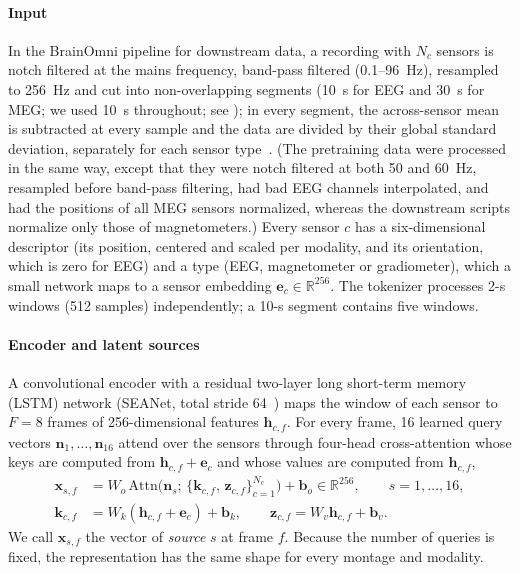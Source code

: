 \documentclass[10pt,letterpaper]{article}
\newcommand{\R}{\mathbb{R}}
\begin{document}
\paragraph*{Input} In the BrainOmni pipeline for downstream data, a recording with $N_c$
sensors is notch filtered at the mains frequency, band-pass filtered (0.1--96~Hz), resampled
to 256~Hz and cut into non-overlapping segments (10~s for EEG and 30~s for MEG; we used 10~s
throughout; see ); in every segment, the across-sensor mean
is subtracted at every sample and the data are divided by their global standard deviation,
separately for each sensor type~\cite{brainomni2025}. (The pretraining data were processed
in the same way, except that they were notch filtered at both 50 and 60~Hz, resampled before
band-pass filtering, had bad EEG channels interpolated, and had the positions of all MEG sensors
normalized, whereas the downstream scripts normalize only those of magnetometers.) Every sensor
$c$ has a six-dimensional descriptor (its position, centered and scaled per modality, and its
orientation, which is zero for EEG) and a type (EEG, magnetometer or gradiometer), which a
small network maps to a sensor embedding $\bm{e}_c\in\R^{256}$.
The tokenizer processes 2-s windows (512 samples) independently; a 10-s segment
contains five windows.

\paragraph*{Encoder and latent sources} A convolutional encoder with a residual two-layer long
short-term memory (LSTM) network (SEANet, total stride 64~\cite{soundstream2021,encodec2022}) maps the window of each sensor
to $F=8$ frames of 256-dimensional features $\bm{h}_{c,f}$. For every frame, 16 learned query vectors
$\bm{n}_1,\dots,\bm{n}_{16}$ attend over the sensors through four-head cross-attention
whose keys are computed from $\bm{h}_{c,f}+\bm{e}_c$ and whose values are computed from
$\bm{h}_{c,f}$,
\begin{equation}
\begin{split}
  \bm{x}_{s,f} &= W_o\,\mathrm{Attn}\bigl(\bm{n}_s;\,\{\bm{k}_{c,f},\,\bm{z}_{c,f}\}_{c=1}^{N_c}\bigr)
  +\bm{b}_o\in\R^{256},\qquad s=1,\dots,16,\\
  \bm{k}_{c,f} &= W_k(\bm{h}_{c,f}+\bm{e}_c)+\bm{b}_k,\qquad \bm{z}_{c,f}=W_v\bm{h}_{c,f}+\bm{b}_v .
\end{split}
\end{equation}
We call $\bm{x}_{s,f}$ the vector of \emph{source} $s$ at frame $f$. Because the number
of queries is fixed, the representation has the same shape for every montage and
modality.
\end{document}
